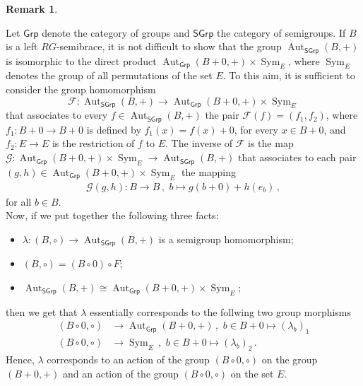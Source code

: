 \documentclass[11pt]{amsart}
\newcommand{\Sym}{\operatorname{Sym}}
\newcommand{\Aut}{\operatorname{Aut}}
\newcommand{\Grp}{\mathsf{Grp}}
\theoremstyle{definition}
\newtheorem{remark}[theorem]{Remark}
\newcommand{\SGrp}{\mathsf{SGrp}}
\begin{document}
\smallskip

\begin{remark}\label{1e2} {\rm Let $\Grp$ denote the category of groups and $\SGrp$ the category of semigroups. %
If $B$ is a left $RG$-semibrace, it is not difficult to show that the group $\Aut_\SGrp(B,+)$ is isomorphic to the direct product $\Aut_\Grp(B+0,+) \times \Sym_E$, where $\Sym_E$ denotes the group of all permutations of the set $E$. 
To this aim, it is sufficient to consider the group homomorphism $$\mathcal{F}\colon\Aut_\SGrp(B,+)\to \Aut_\Grp(B+0,+) \times \Sym_E$$ that associates to every $f\in \Aut_\SGrp(B,+)$ the pair $\mathcal{F}(f)=(f_1,f_2)$, where $f_1\colon B+0\to B+0$ is defined by $f_1(x)=f(x)+0$, for every $x\in B+0$, and $f_2\colon E\to E$ is the restriction of $f$ to $E$. 
The inverse of $\mathcal{F}$ is the map $\mathcal{G}\colon\Aut_\Grp(B+0,+) \times \Sym_E\to \Aut_\SGrp(B,+)$ that associates to each pair $(g,h)\in \Aut_\Grp(B+0,+) \times \Sym_E$ the mapping 
\begin{align*}
    \mathcal{G}(g,h): B\to B \,,\,\, b \mapsto g(b+0)+h(e_b) \,,
\end{align*}
for all $b\in B$. \\
Now, if we put together the following three facts:
\begin{itemize}
    \item[{\rm(1)}] $\lambda\colon (B, \circ)\to \Aut_\SGrp(B, +)$ is a semigroup homomorphism;
    \item[{\rm(2)}] $(B, \circ)=(B\circ 0)\circ F$;
    \item[\rm{(3)}]$\Aut_\SGrp(B,+)\cong\Aut_\Grp(B+0,+) \times \Sym_E$; 
    \end{itemize}
    then we get that $\lambda$ essentially corresponds to the follwing two group morphisms 
    \begin{align*}
        (B\circ 0, \circ) &\to \Aut_\Grp(B+0,+) \,,\,\, b\in B+0\mapsto (\lambda_b)_1 \\
        (B\circ 0, \circ) &\to \Sym_E \,,\,\, b\in B+0\mapsto (\lambda_b)_2 \,.
    \end{align*}
    Hence, $\lambda$ corresponds to an action of the group $(B\circ 0, \circ)$ on the group $(B+0,+)$ and an action of the group $(B\circ 0, \circ)$ on the set $E$.}
\end{remark}
\end{document}
